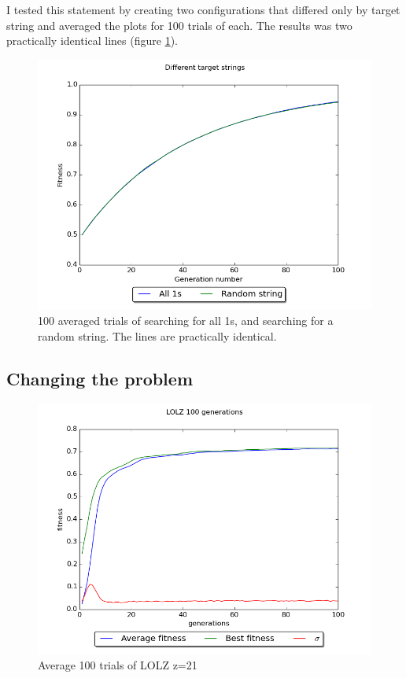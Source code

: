 I tested this statement by creating two configurations that differed only by target string and averaged the plots for 100 trials of each.
The results was two practically identical lines (figure \ref{different_targets}).

\begin{figure}[width=\textwidth]
    \begin{centering}
        \includegraphics[width=\linewidth]{img/different_targets.png}
        \caption{100 averaged trials of searching for all 1s, and searching for a random string. The lines are practically identical.}
        \label{different_targets}
    \end{centering}
\end{figure}

\subsection*{Changing the problem}
\begin{figure}[width=\textwidth]
    \begin{centering}
        \includegraphics[width=\linewidth]{img/lolz_100x100.png}
        \caption{Average 100 trials of LOLZ z=21}
        \label{lolz_100x100}
    \end{centering}
\end{figure}

